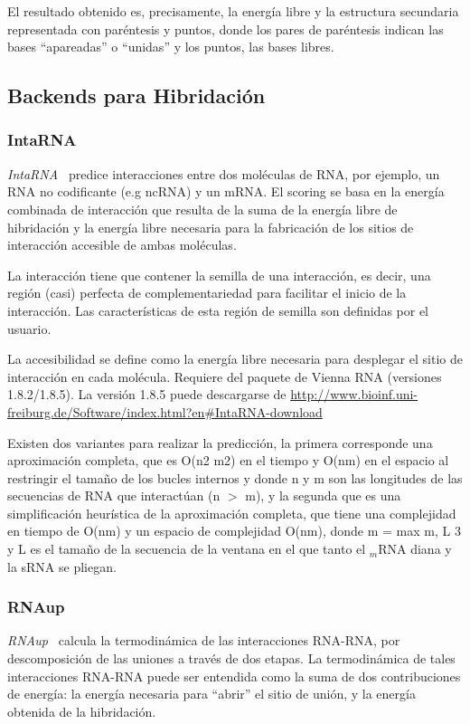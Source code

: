 \par El resultado obtenido es, precisamente, la energía libre y la estructura secundaria representada con paréntesis y puntos, donde los pares de paréntesis indican las bases ``apareadas'' o ``unidas'' y los puntos, las bases libres.

\subsection{Backends para Hibridación} %
\label{hibrid}

\subsubsection{IntaRNA}
\par \emph{IntaRNA~\cite{intaRNA}} predice interacciones entre dos moléculas de RNA, por ejemplo, un RNA no codificante (e.g
ncRNA) y un mRNA. El scoring se basa en la energía combinada de interacción que resulta de la suma de la energía libre de hibridación y la energía libre necesaria para la fabricación de los sitios de interacción accesible de ambas moléculas.

\par La interacción tiene que contener la semilla de una interacción, es decir, una región (casi) perfecta de complementariedad para facilitar el inicio de la interacción. Las características de esta región de semilla son definidas por el usuario.

\par La accesibilidad se define como la energía libre necesaria para desplegar el sitio de interacción en cada molécula. Requiere del paquete de Vienna RNA (versiones 1.8.2/1.8.5). La versión 1.8.5 puede descargarse de \url{http://www.bioinf.uni-freiburg.de/Software/index.html?en\#IntaRNA-download}

\par Existen dos variantes para realizar la predicción, la primera corresponde una aproximación completa, que es O(n2 m2) en el tiempo y O(nm) en el espacio al restringir el tamaño de los bucles internos y donde n y m son las longitudes de las secuencias de RNA que interactúan (n $>$ m), y la segunda que es una simplificación heurística de la aproximación completa, que tiene una complejidad en tiempo de O(nm) y un espacio de complejidad O(nm), donde m = max {m, L 3} y L es el tamaño de la secuencia de la ventana en el que tanto el $_m$RNA diana y la sRNA se pliegan.

\subsubsection{RNAup}
\par \emph{RNAup~\cite{rnaup}} calcula la termodinámica de las interacciones RNA-RNA, por descomposición de las uniones a
través de dos etapas. La termodinámica de tales interacciones RNA-RNA puede ser entendida como la suma de dos contribuciones de energía: la energía necesaria para ``abrir'' el sitio de unión, y la energía obtenida de la hibridación.

